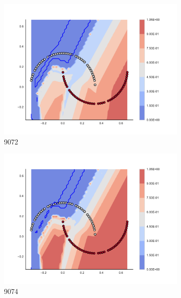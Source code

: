 \begin{figure}[h]
\begin{subfigure}[b]{0.09\textwidth}
    \includegraphics[clip, trim=2.35cm 1.75cm 4.5cm 0cm,width=\textwidth]{img/convergence/9072.pdf}
    \caption{9072}
    \label{fig:convergence_9072}
\end{subfigure}
%
\begin{subfigure}[b]{0.09\textwidth}
    \includegraphics[clip, trim=2.35cm 1.75cm 4.5cm 0cm,width=\textwidth]{img/convergence/9074.pdf}
    \caption{9074}
    \label{fig:convergence_9074}
\end{subfigure}
%
\begin{subfigure}[b]{0.09\textwidth}

\end{subfigure}
\end{figure}
